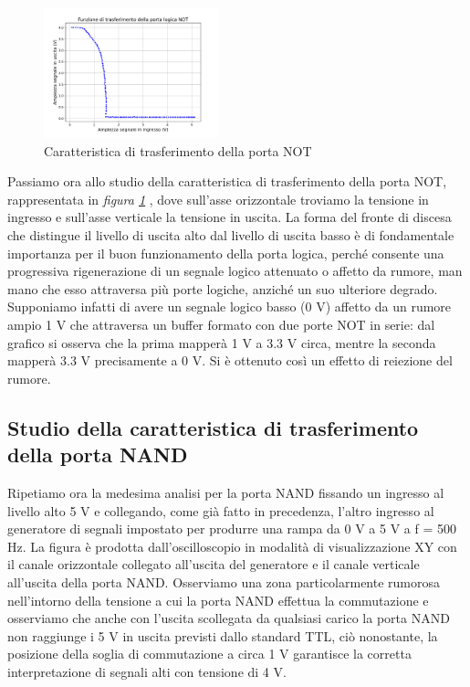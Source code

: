 \documentclass[journal]{IEEEtran}
\begin{document}
\begin{figure}[H]%
\begin{center}
\includegraphics[width=0.45\textwidth]{analysis/output/inverter_ring_xy.pdf}
\caption{Caratteristica di trasferimento della porta NOT}
\label{fig:transf_not}
\end{center}
\end{figure}

Passiamo ora allo studio della caratteristica di trasferimento della porta NOT, rappresentata in \textit{figura \ref{fig:transf_not}}
, dove sull'asse orizzontale troviamo la tensione in ingresso e sull'asse verticale la tensione in uscita. La forma del fronte di discesa che distingue il livello di uscita alto dal livello di uscita basso è di fondamentale importanza per il buon funzionamento della porta logica, perché consente una progressiva rigenerazione di un segnale logico attenuato o affetto da rumore, man mano che esso attraversa più porte logiche, anziché un suo ulteriore degrado. Supponiamo infatti di avere un segnale logico basso (0 V) affetto da un rumore ampio 1 V che attraversa un buffer formato con due porte NOT in serie: dal grafico si osserva che la prima mapperà 1 V a 3.3 V circa, mentre la seconda mapperà 3.3 V precisamente a 0 V. Si è ottenuto così un effetto di reiezione del rumore.


\subsection{Studio della caratteristica di trasferimento della porta NAND}
Ripetiamo ora la medesima analisi per la porta NAND fissando un ingresso al livello alto 5 V e collegando, come già fatto in precedenza, l'altro ingresso al generatore di segnali impostato per produrre una rampa da 0 V a 5 V a f = 500 Hz. La figura è prodotta dall'oscilloscopio in modalità di visualizzazione XY con il canale orizzontale collegato all'uscita del generatore e il canale verticale all'uscita della porta NAND. Osserviamo una zona particolarmente rumorosa nell'intorno della tensione a cui la porta NAND effettua la commutazione e osserviamo che anche con l'uscita scollegata da qualsiasi carico la porta NAND non raggiunge i 5 V in uscita previsti dallo standard TTL, ciò nonostante, la posizione della soglia di commutazione a circa 1 V garantisce la corretta interpretazione di segnali alti con tensione di 4 V.
\end{document}
